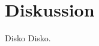 \documentclass[../Abschlussarbeit.tex]{subfiles}
\begin{document}
\section{Diskussion}
Disko Disko.
\end{document}
